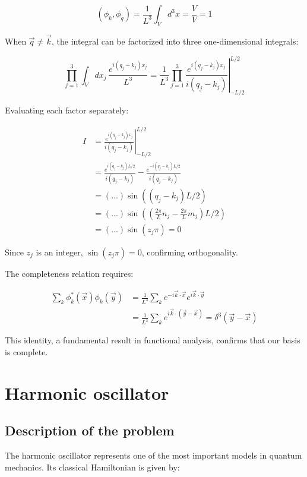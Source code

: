 \documentclass[italian]{HKNdocument}
\begin{document}
\begin{equation}
(\phi_k, \phi_q) = \frac{1}{L^3}\int_V d^3x = \frac{V}{V} = 1
\end{equation}

When $\vec{q} \neq \vec{k}$, the integral can be factorized into three one-dimensional integrals:

\begin{equation}
\prod_{j=1}^3 \int_V dx_j\, \frac{e^{i(q_j-k_j)x_j}}{L^3} = \left.\frac{1}{L^3}\prod_{j=1}^3 \frac{e^{i(q_j-k_j)x_j}}{i(q_j-k_j)}\right|_{-L/2}^{L/2}
\end{equation}

Evaluating each factor separately:

\begin{align}
I &= \left.\frac{e^{i(q_j-k_j)x_j}}{i(q_j-k_j)}\right|_{-L/2}^{L/2} \\
&= \frac{e^{i(q_j-k_j)L/2}}{i(q_j-k_j)} - \frac{e^{-i(q_j-k_j)L/2}}{i(q_j-k_j)} \\
&= (\ldots)\sin((q_j-k_j)L/2)  \\
&= (\ldots)\sin((\frac{2\pi}{L}n_j-\frac{2\pi}{L}m_j)L/2) \\
&= (\ldots)\sin(z_j\pi) = 0
\end{align}

Since $z_j$ is an integer, $\sin(z_j\pi) = 0$, confirming orthogonality.

The completeness relation requires:

\begin{align}
\sum_k \phi_k^*(\vec{x})\phi_k(\vec{y}) &= \frac{1}{L^3}\sum_k e^{-i\vec{k}\cdot\vec{x}}e^{i\vec{k}\cdot\vec{y}} \\
&= \frac{1}{L^3}\sum_k e^{i\vec{k}\cdot(\vec{y}-\vec{x})} = \delta^3(\vec{y}-\vec{x})
\end{align}

This identity, a fundamental result in functional analysis, confirms that our basis is complete.

\section{Harmonic oscillator}
\subsection{Description of the problem}

The harmonic oscillator represents one of the most important models in quantum mechanics. Its classical Hamiltonian is given by:
\end{document}

